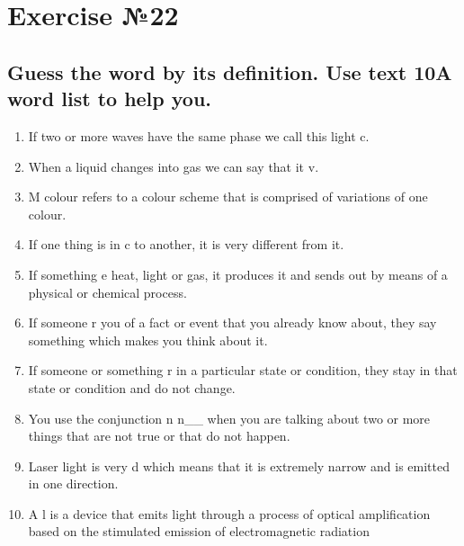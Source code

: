 \section{Exercise №22}
\subsection*{Guess the word by its definition. Use text 10A word list to help you.}
\begin{enumerate}
      \item If two or more waves have the same phase we call this light c\underline{\hspace{2cm}}.
      \item When a liquid changes into gas we can say that it v\underline{\hspace{2cm}}.
      \item M\underline{\hspace{2cm}} colour refers to a colour scheme that is comprised of variations
            of one colour.
      \item If one thing is in c\underline{\hspace{2cm}} to another, it is very different from it.
      \item If something e\underline{\hspace{2cm}} heat, light or gas, it produces it and sends out
            by means of a physical or chemical process.
      \item If someone r\underline{\hspace{2cm}} you of a fact or event that you already know about,
            they say something which makes you think about it.
      \item If someone or something r\underline{\hspace{2cm}} in a particular state or condition,
            they stay in that state or condition and do not change.
      \item You use the conjunction n\underline{\hspace{2cm}} n\_\_ when you are talking about two
            or more things that are not true or that do not happen.
      \item Laser light is very d\underline{\hspace{2cm}} which means that it is extremely narrow
            and is emitted in one direction.
      \item A l\underline{\hspace{2cm}} is a device that emits light through a process of optical
            amplification based on the stimulated emission of electromagnetic radiation
\end{enumerate}

